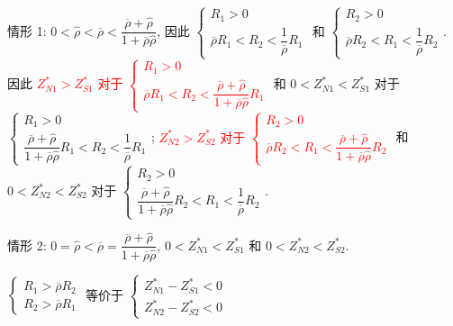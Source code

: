 \documentclass[10.0pt]{article}
\newcommand{\hhred}{\textcolor{red}}
\begin{document}
情形 1: $ 0 < {\hat \rho} < \overline{\rho} < \dfrac{\overline{\rho} + {\hat \rho}}{1 + \overline{\rho} {\hat \rho}} $, 
因此 $ \left\{ \begin{matrix} R_1 > 0 \\ \overline{\rho} R_1 < R_2 < \dfrac{1}{\overline{\rho}} R_1 \end{matrix} \right. $ 和 $ \left\{ \begin{matrix} R_2 > 0 \\ \overline{\rho} R_2 < R_1 < \dfrac{1}{\overline{\rho}} R_2 \end{matrix} \right. $.
因此 \hhred{$ Z_{N 1}^* > Z_{S 1}^* $ 对于 $ \left\{ \begin{matrix} R_1 > 0 \\ \overline{\rho} R_1 < R_2 < \dfrac{\overline{\rho} + {\hat \rho}}{1 + \overline{\rho} {\hat \rho}} R_1 \end{matrix} \right. $} 和 $ 0 < Z_{N 1}^* < Z_{S 1}^* $ 对于 $ \left\{ \begin{matrix} R_1 > 0 \\ \dfrac{\overline{\rho} + {\hat \rho}}{1 + \overline{\rho} {\hat \rho}} R_1 < R_2 < \dfrac{1}{\overline{\rho}} R_1 \end{matrix} \right. $; 
\hhred{$ Z_{N 2}^* > Z_{S 2}^* $ 对于 $ \left\{ \begin{matrix} R_2 > 0 \\ \overline{\rho} R_2 < R_1 < \dfrac{\overline{\rho} + {\hat \rho}}{1 + \overline{\rho} {\hat \rho}} R_2 \end{matrix} \right. $} 和 $ 0 < Z_{N 2}^* < Z_{S 2}^* $ 对于 $ \left\{ \begin{matrix} R_2 > 0 \\ \dfrac{\overline{\rho} + {\hat \rho}}{1 + \overline{\rho} {\hat \rho}} R_2 < R_1 < \dfrac{1}{\overline{\rho}} R_2 \end{matrix} \right. $.

情形 2: $ 0 = {\hat \rho} < \overline{\rho} = \dfrac{\overline{\rho} + {\hat \rho}}{1 + \overline{\rho} {\hat \rho}} $, $ 0 < Z_{N 1}^* < Z_{S 1}^* $ 和 $ 0 < Z_{N 2}^* < Z_{S 2}^* $.

$ \left\{ \begin{matrix} R_1 > \overline{\rho} R_2 \\ R_2 > \overline{\rho} R_1 \end{matrix} \right. $ 等价于 $ \left\{ \begin{matrix} Z_{N 1}^* - Z_{S 1}^* < 0 \\ Z_{N 2}^* - Z_{S 2}^* < 0 \end{matrix} \right. $
\end{document}
